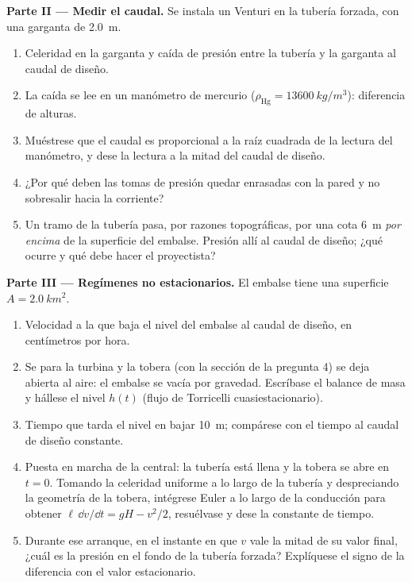 \begin{problem}
\medskip
\noindent\textbf{Parte II --- Medir el caudal.}
Se instala un Venturi en la tubería forzada, con una garganta de \qty{2.0}{m}.
\begin{enumerate}[resume]
  \item Celeridad en la garganta y caída de presión entre la tubería y la
        garganta al caudal de diseño.
  \item La caída se lee en un manómetro de mercurio ($\rho_{\text{Hg}} =
        \qty{13600}{kg/m^3}$): diferencia de alturas.
  \item Muéstrese que el caudal es proporcional a la raíz cuadrada de la
        lectura del manómetro, y dese la lectura a la mitad del caudal de
        diseño.
  \item ¿Por qué deben las tomas de presión quedar enrasadas con la pared
        y no sobresalir hacia la corriente?
  \item Un tramo de la tubería pasa, por razones topográficas, por una
        cota \qty{6}{m} \emph{por encima} de la superficie del embalse.
        Presión allí al caudal de diseño; ¿qué ocurre y qué debe hacer el
        proyectista?
\end{enumerate}

\medskip
\noindent\textbf{Parte III --- Regímenes no estacionarios.}
El embalse tiene una superficie $A = \qty{2.0}{km^2}$.
\begin{enumerate}[resume]
  \item Velocidad a la que baja el nivel del embalse al caudal de diseño,
        en centímetros por hora.
  \item Se para la turbina y la tobera (con la sección de la pregunta 4)
        se deja abierta al aire: el embalse se vacía por gravedad.
        Escríbase el balance de masa y hállese el nivel $h(t)$ (flujo de
        Torricelli cuasiestacionario).
  \item Tiempo que tarda el nivel en bajar \qty{10}{m}; compárese con el
        tiempo al caudal de diseño constante.
  \item Puesta en marcha de la central: la tubería está llena y la tobera
        se abre en $t = 0$. Tomando la celeridad uniforme a lo largo de la
        tubería y despreciando la geometría de la tobera, intégrese Euler
        a lo largo de la conducción para obtener $\ell\,\dd v/\dd t = gH - v^2/2$,
        resuélvase y dese la constante de tiempo.
  \item Durante ese arranque, en el instante en que $v$ vale la mitad de
        su valor final, ¿cuál es la presión en el fondo de la tubería
        forzada? Explíquese el signo de la diferencia con el valor
        estacionario.
\end{enumerate}


\end{problem}
